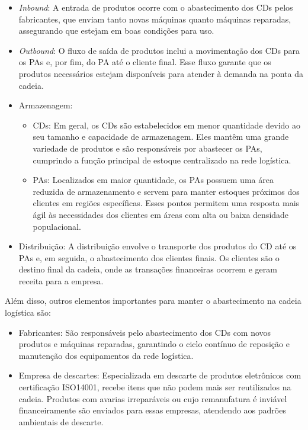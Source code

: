 \begin{itemize}
    \item \emph{Inbound}: A entrada de produtos ocorre com o abastecimento dos CDs pelos fabricantes, que enviam tanto novas máquinas quanto máquinas reparadas, assegurando que estejam em boas condições para uso.

    \item \emph{Outbound}: O fluxo de saída de produtos inclui a movimentação dos CDs para os PAs e, por fim, do PA até o cliente final. Esse fluxo garante que os produtos necessários estejam disponíveis para atender à demanda na ponta da cadeia.

    \item Armazenagem: 
        \begin{itemize}
            \item CDs: Em geral, os CDs são estabelecidos em menor quantidade devido ao seu tamanho e capacidade de armazenagem. Eles mantêm uma grande variedade de produtos e são responsáveis por abastecer os PAs, cumprindo a função principal de estoque centralizado na rede logística.
            \item PAs: Localizados em maior quantidade, os PAs possuem uma área reduzida de armazenamento e servem para manter estoques próximos dos clientes em regiões específicas. Esses pontos permitem uma resposta mais ágil às necessidades dos clientes em áreas com alta ou baixa densidade populacional.
        \end{itemize}

    \item Distribuição: A distribuição envolve o transporte dos produtos do CD até os PAs e, em seguida, o abastecimento dos clientes finais. Os clientes são o destino final da cadeia, onde as transações financeiras ocorrem e geram receita para a empresa.
\end{itemize}

Além disso, outros elementos importantes para manter o abastecimento na cadeia logística são:

\begin{itemize}
    \item Fabricantes: São responsáveis pelo abastecimento dos CDs com novos produtos e máquinas reparadas, garantindo o ciclo contínuo de reposição e manutenção dos equipamentos da rede logística.
    
    \item Empresa de descartes: Especializada em descarte de produtos eletrônicos com certificação ISO14001, recebe itens que não podem mais ser reutilizados na cadeia. Produtos com avarias irreparáveis ou cujo remanufatura é inviável financeiramente são enviados para essas empresas, atendendo aos padrões ambientais de descarte.
\end{itemize}

